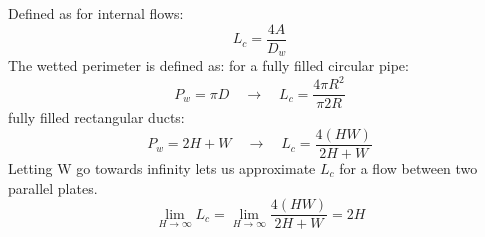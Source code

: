 Defined as for internal flows:
$$
	L_c=\frac{4A}{D_w}
$$
The wetted perimeter is defined as:
for a fully filled circular pipe:
$$
	P_w = \pi D \quad \rightarrow \quad L_c =\frac{4\pi R^2}{\pi 2R}
$$
fully filled rectangular ducts:
$$
	P_w = 2H + W \quad \rightarrow \quad L_c = \frac{4(HW)}{2H+W} 
$$
Letting W go towards infinity lets us approximate $L_c$ for a flow between two parallel plates.
$$
	\lim_{H \to \infty} L_c =  \lim_{H \to \infty} \frac{4(HW)}{2H+W} = 2H
$$ 
